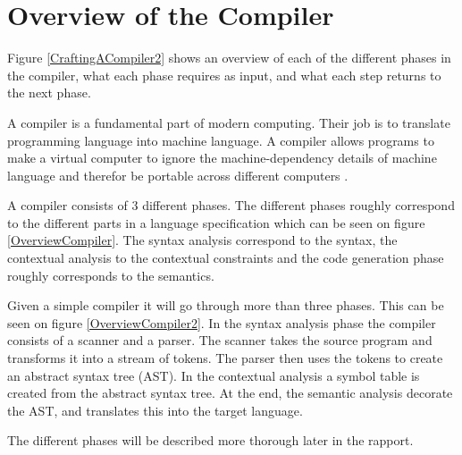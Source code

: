 \section{Overview of the Compiler}


Figure \ref{CraftingACompiler2} shows an overview of each of the different phases in the compiler, what each phase requires as input, and what each step returns to the next phase.

A compiler is a fundamental part of modern computing. Their job is to translate programming language into machine language. A compiler allows programs to make a virtual computer to ignore the machine-dependency details of machine language and therefor be portable across different computers  \citep{CraftingACompiler}.


A compiler consists of 3 different phases. The different phases roughly correspond to the different parts in a language specification which can be seen on figure \ref{OverviewCompiler}. The syntax analysis correspond to the syntax, the contextual analysis to the contextual constraints and the code generation phase roughly corresponds to the semantics.

Given a simple compiler it will go through more than three phases. This can be seen on figure \ref{OverviewCompiler2}. In the syntax analysis phase the compiler consists of a scanner and a parser. The scanner takes the source program and transforms it into a stream of tokens. The parser then uses the tokens to create an abstract syntax tree (AST). In the contextual analysis a symbol table is created from the abstract syntax tree. At the end, the semantic analysis decorate the AST, and translates this into the target language.

The different phases will be described more thorough later in the rapport. 